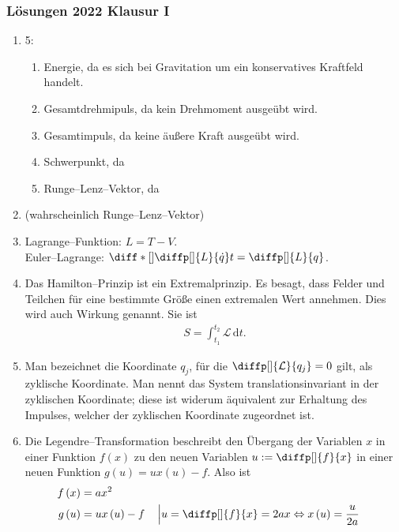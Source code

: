 \documentclass[a4paper,12pt]{article}
\newcommand{\td}{\,\text{d}}
\numberwithin{equation}{section}
\begin{document}
\newpage
\subsubsection{Lösungen 2022 Klausur I}
\begin{enumerate}[label=\arabic*.]
        \item 5:
                \begin{enumerate}[label=\alph*)]
                        \item Energie, da es sich bei Gravitation um ein konservatives Kraftfeld handelt.
                        \item Gesamtdrehmipuls, da kein Drehmoment ausgeübt wird.
                        \item Gesamtimpuls, da keine äußere Kraft ausgeübt wird.
                        \item Schwerpunkt, da
                        \item Runge--Lenz--Vektor, da
                \end{enumerate}
        \item (wahrscheinlich Runge--Lenz--Vektor)
        \item Lagrange--Funktion: $L=T-V$. \\
                Euler--Lagrange: $\diff*[]{\diffp[]{L}{\dot{q}} }{t}=\diffp[]{L}{q}$.
        \item Das Hamilton--Prinzip ist ein Extremalprinzip. Es besagt, dass Felder und Teilchen für eine bestimmte Größe einen extremalen Wert annehmen. Dies wird auch Wirkung genannt. Sie ist
                \begin{align*} 
                        S=\int_{t_1}^{t_2}\mathcal{L}\td t
                .\end{align*} 
        \item Man bezeichnet die Koordinate $q_j$, für die $\diffp[]{\mathcal{L}}{q_j}=0$ gilt, als zyklische Koordinate. Man nennt das System translationsinvariant in der zyklischen Koordinate; diese ist widerum äquivalent zur Erhaltung des Impulses, welcher der zyklischen Koordinate zugeordnet ist.
        \item Die Legendre--Transformation beschreibt den Übergang der Variablen $x$ in einer Funktion $f\left(x\right)$ zu den neuen Variablen $u:=\diffp[]{f}{x}$ in einer neuen Funktion $g\left(u\right)=ux\left(u\right)-f$. Also ist
                \begin{align*} 
                        f\left(x\right)&=ax^2\\
                        g\left(u\right)&=ux\left(u\right)-f&&\left|u=\diffp[]{f}{x}=2ax\Leftrightarrow x\left(u\right)=\dfrac{u}{2a}\right.\\

\end{align*}
\end{enumerate}
\end{document}
